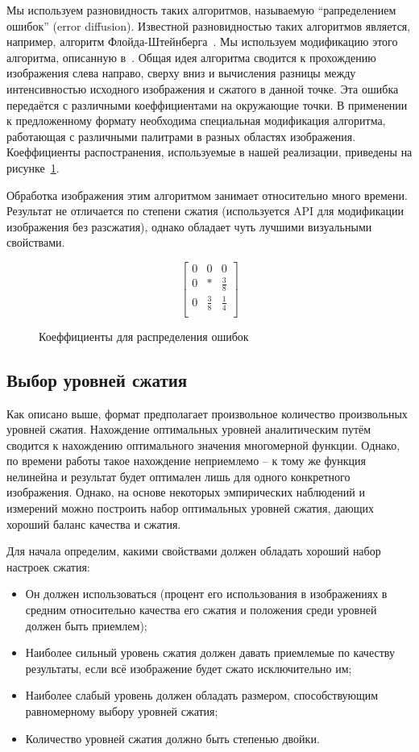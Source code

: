 \documentclass[a4paper,12pt]{article}
\numberwithin{equation}{section}
\begin{document}
Мы используем разновидность таких алгоритмов, называемую ``рапределением
ошибок'' (error diffusion). Известной разновидностью таких алгоритмов является,
например, алгоритм Флойда-Штейнберга~\cite{wiki:floyd}. Мы используем
модификацию этого алгоритма, описанную в~\cite{leptonica:colorquant}.
Общая идея алгоритма сводится к прохождению изображения слева направо, сверху
вниз и вычисления разницы между интенсивностью исходного изображения и сжатого в
данной точке. Эта ошибка передаётся с различными коеффициентами на окружающие
точки. В применении к предложенному формату необходима специальная модификация
алгоритма, работающая с различными палитрами в разных областях изображения.
Коеффициенты распостранения, используемые в нашей реализации, приведены на
рисунке~\ref{fig:dithermtx}.

Обработка изображения этим алгоритмом занимает относительно много
времени. Результат не отличается по степени сжатия (используется API для
модификации изображения без разсжатия), однако обладает чуть лучшими визуальными
свойствами.

\begin{figure}
  \centering
  \[
  \begin{bmatrix}
    0 & 0 & 0 \\
    0 & * & \frac{3}{8} \\
    0 & \frac{3}{8} & \frac{1}{4} \\
  \end{bmatrix}
  \]
  
  \caption{Коеффициенты для распределения ошибок}
  \label{fig:dithermtx}
\end{figure}

\subsection{Выбор уровней сжатия}

Как описано выше, формат предполагает произвольное количество произвольных
уровней сжатия. Нахождение оптимальных уровней аналитическим путём сводится к
нахождению оптимального значения многомерной функции. Однако, по времени работы
такое нахождение неприемлемо -- к тому же функция нелинейна и результат будет
оптимален лишь для одного конкретного изображения. Однако, на основе некоторых
эмпирических наблюдений и измерений можно построить набор оптимальных уровней
сжатия, дающих хороший баланс качества и сжатия.

Для начала определим, какими свойствами должен обладать хороший набор настроек
сжатия:
\begin{itemize}
\item Он должен использоваться (процент его использования в изображениях в
  средним относительно качества его сжатия и положения среди уровней должен быть приемлем);
\item Наиболее сильный уровень сжатия должен давать приемлемые по качеству
  результаты, если всё изображение будет сжато исключительно им;
\item Наиболее слабый уровень должен обладать размером, способствующим
  равномерному выбору уровней сжатия;
\item Количество уровней сжатия должно быть степенью двойки.
\end{itemize}
\end{document}
